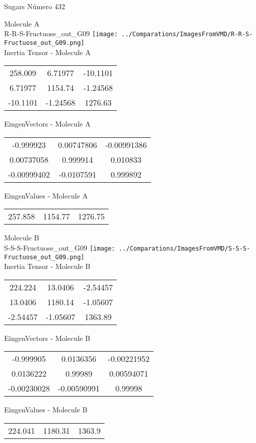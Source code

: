 \vtab[-2cm]
\begin{center}
{\large Sugars \tab Número 432}
\end{center}
\begin{multicols}{2}
\begin{center}

Molecule A \\ 
R-R-S-Fructuose\_out\_G09
\texttt{[image: ../Comparations/ImagesFromVMD/R-R-S-Fructuose\_out\_G09.png]}
\\
Inertia Tensor - Molecule A \\
\vtab

\begin{tabular}{|c c c|}
258.009	 & 	6.71977	 & 	-10.1101	 \\
6.71977	 & 	1154.74	 & 	-1.24568	 \\
-10.1101	 & 	-1.24568	 & 	1276.63
\end{tabular}

\vtab
 EingenVectors - Molecule A     \\
\vtab
\begin{tabular}{|c c c|}
-0.999923	 & 	0.00747806	 & 	-0.00991386	 \\
0.00737058	 & 	0.999914	 & 	0.010833	 \\
-0.00999402	 & 	-0.0107591	 & 	0.999892
\end{tabular}

\vtab
 EingenValues - Molecule A     \\
\vtab
\begin{tabular}{|c c c|}
257.858	 & 	1154.77	 & 	1276.75	 \\
\end{tabular}
\columnbreak

Molecule B \\ 
S-S-S-Fructuose\_out\_G09
\texttt{[image: ../Comparations/ImagesFromVMD/S-S-S-Fructuose\_out\_G09.png]}
\\
Inertia Tensor - Molecule B \\
\vtab

\begin{tabular}{|c c c|}
224.224	 & 	13.0406	 & 	-2.54457	 \\
13.0406	 & 	1180.14	 & 	-1.05607	 \\
-2.54457	 & 	-1.05607	 & 	1363.89
\end{tabular}

\vtab
 EingenVectors - Molecule B     \\
\vtab
\begin{tabular}{|c c c|}
-0.999905	 & 	0.0136356	 & 	-0.00221952	 \\
0.0136222	 & 	0.99989	 & 	0.00594071	 \\
-0.00230028	 & 	-0.00590991	 & 	0.99998
\end{tabular}

\vtab
 EingenValues - Molecule B     \\
\vtab
\begin{tabular}{|c c c|}
224.041	 & 	1180.31	 & 	1363.9	 \\
\end{tabular}

\end{center}
\end{multicols}
